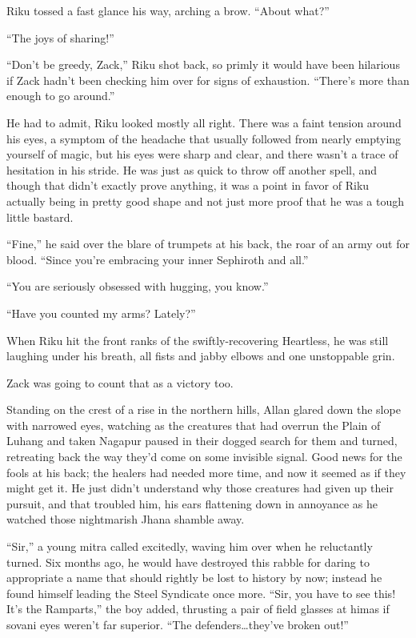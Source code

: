 Riku tossed a fast glance his way, arching a brow. ``About what?''

``The joys of sharing!''

``Don't be greedy, Zack,'' Riku shot back, so primly it would have been hilarious if Zack hadn't been checking him over for signs of exhaustion. ``There's more than enough to go around.''

He had to admit, Riku looked mostly all right. There was a faint tension around his eyes, a symptom of the headache that usually followed from nearly emptying yourself of magic, but his eyes were sharp and clear, and there wasn't a trace of hesitation in his stride. He was just as quick to throw off another spell, and though that didn't exactly prove anything, it was a point in favor of Riku actually being in pretty good shape and not just more proof that he was a tough little bastard.

``Fine,'' he said over the blare of trumpets at his back, the roar of an army out for blood. ``Since you're embracing your inner Sephiroth and all.''

``You are seriously obsessed with hugging, you know.''

``Have you counted my arms? Lately?''

When Riku hit the front ranks of the swiftly-recovering Heartless, he was still laughing under his breath, all fists and jabby elbows and one unstoppable grin.

Zack was going to count that as a victory too.


\scenechange


Standing on the crest of a rise in the northern hills, Allan glared down the slope with narrowed eyes, watching as the creatures that had overrun the Plain of Luhang and taken Nagapur paused in their dogged search for them and turned, retreating back the way they'd come on some invisible signal. Good news for the fools at his back; the healers had needed more time, and now it seemed as if they might get it. He just didn't understand why those creatures had given up their pursuit, and that troubled him, his ears flattening down in annoyance as he watched those nightmarish Jhana shamble away.

``Sir,'' a young mitra called excitedly, waving him over when he reluctantly turned. Six months ago, he would have destroyed this rabble for daring to appropriate a name that should rightly be lost to history by now; instead he found himself leading the Steel Syndicate once more. ``Sir, you have to see this! It's the Ramparts,'' the boy added, thrusting a pair of field glasses at him\textemdash as if sovani eyes weren't far superior. ``The defenders\ldots they've broken out!''

